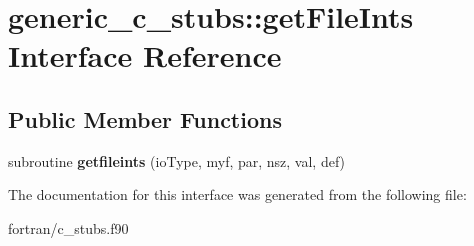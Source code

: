 \hypertarget{interfacegeneric__c__stubs_1_1get_file_ints}{}\section{generic\+\_\+c\+\_\+stubs\+:\+:get\+File\+Ints Interface Reference}
\label{interfacegeneric__c__stubs_1_1get_file_ints}
\subsection*{Public Member Functions}
\begin{DoxyCompactItemize}
\item 
\mbox{\label{interfacegeneric__c__stubs_1_1get_file_ints_a79532c4e9af642fcf8de25f6e50140c0}} 
subroutine {\bfseries getfileints} (io\+Type, myf, par, nsz, val, def)
\end{DoxyCompactItemize}


The documentation for this interface was generated from the following file\+:\begin{DoxyCompactItemize}
\item 
fortran/c\+\_\+stubs.\+f90\end{DoxyCompactItemize}

